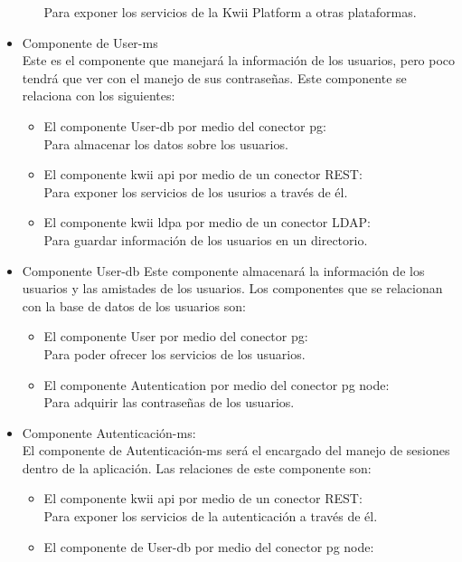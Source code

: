 \begin{itemize}
\begin{itemize}
        Para exponer los servicios de la Kwii Platform a otras plataformas.
    \end{itemize}
    \item Componente de User-ms\\
    Este es el componente que manejará la información de los usuarios, pero poco tendrá que ver con el manejo de sus contraseñas.
    Este componente se relaciona con los siguientes:
    \begin{itemize}
        \item El componente User-db por medio del conector pg:\\
        Para almacenar los datos sobre los usuarios.
        \item El componente kwii \textunderscore api por medio de un conector REST:\\
        Para exponer los servicios de los usurios a través de él.
        \item El componente kwii \textunderscore ldpa por medio de un conector LDAP:\\
        Para guardar información de los usuarios en un directorio.
    \end{itemize}
    \item Componente User-db
    Este componente almacenará la información de los usuarios y las amistades de los usuarios.
    Los componentes que se relacionan con la base de datos de los usuarios son:
    \begin{itemize}
        \item El componente User por medio del conector pg:\\
        Para poder ofrecer los servicios de los usuarios.
        \item El componente Autentication por medio del conector pg node:\\
        Para adquirir las contraseñas de los usuarios.
    \end{itemize}
    \item Componente Autenticación-ms:\\
    El componente de Autenticación-ms será el encargado del manejo de sesiones dentro de la aplicación.
    Las relaciones de este componente son:
    \begin{itemize}
        \item El componente kwii \textunderscore api por medio de un conector REST:\\
        Para exponer los servicios de la autenticación a través de él.
        \item El componente de User-db por medio del conector pg node:\\

\end{itemize}
\end{itemize}
